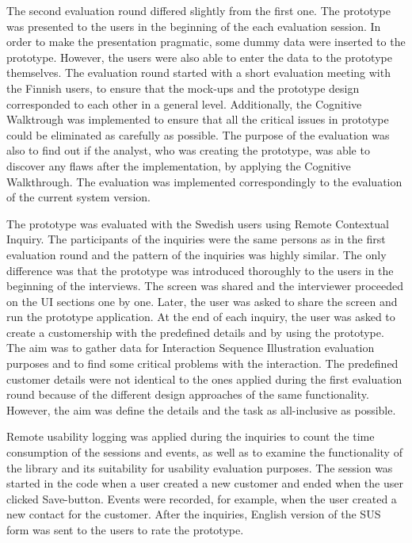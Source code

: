 \documentclass[12pt,a4paper,oneside,pdftex]{report}
\begin{document}
The second evaluation round differed slightly from the first one. The prototype was presented to the users in the beginning of the each evaluation session. In order to make the presentation pragmatic, some dummy data were inserted to the prototype. However, the users were also able to enter the data to the prototype themselves. The evaluation round started with a short evaluation meeting with the Finnish users, to ensure that the mock-ups and the prototype design corresponded to each other in a general level. Additionally, the Cognitive Walktrough was implemented to ensure that all the critical issues in prototype could be eliminated as carefully as possible. The purpose of the evaluation was also to find out if the analyst, who was creating the prototype, was able to discover any flaws after the implementation, by applying the Cognitive Walkthrough. The evaluation was implemented correspondingly to the evaluation of the current system version. 

The prototype was evaluated with the Swedish users using Remote Contextual Inquiry. The participants of the inquiries were the same persons as in the first evaluation round and the pattern of the inquiries was highly similar. The only difference was that the prototype was introduced thoroughly to the users in the beginning of the interviews. The screen was shared and the interviewer proceeded on the UI sections one by one. Later, the user was asked to share the screen and run the prototype application. At the end of each inquiry, the user was asked to create a customership with the predefined details and by using the prototype. The aim was to gather data for Interaction Sequence Illustration evaluation purposes and to find some critical problems with the interaction. The predefined customer details were not identical to the ones applied during the first evaluation round because of the different design approaches of the same functionality. However, the aim was define the details and the task as all-inclusive as possible. 

Remote usability logging was applied during the inquiries to count the time consumption of the sessions and events, as well as to examine the functionality of the library and its suitability for usability evaluation purposes. The session was started in the code when a user created a new customer and ended when the user clicked Save-button. Events were recorded, for example, when the user created a new contact for the customer. After the inquiries, English version of the SUS form was sent to the users to rate the prototype.
\end{document}
